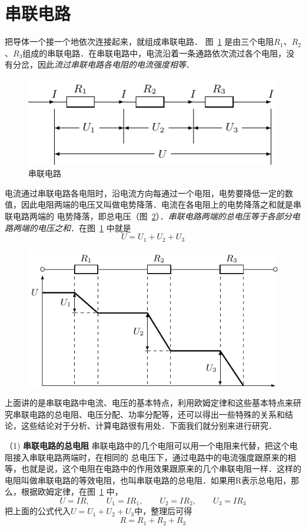 \section{串联电路}
把导体一个接一个地依次连接起来，就组成串联电路．
图~\ref{fig_B_7-5} 是由三个电阻$R_1$、$R_2$、$R_3$组成的串联电路．在串联电路中，电流沿着一条通路依次流过各个电阻，没有分岔，因此\textit{流过串联电路各电阻的电流强度相等}．
\begin{figure}[htbp]
    \centering
    \includegraphics{fig/B/7-5.pdf}
    \caption{串联电路}\label{fig_B_7-5}
\end{figure}	

电流通过串联电路各电阻时，沿电流方向每通过一个电阻，电势要降低一定的数值，因此电阻两端的电压又叫做电势降落．电流在各电阻上的电势降落之和就是串联电路两端的
电势降落，即总电压（图~\ref{fig_B_7-6}）．\textit{串联电路两端的总电压等于各部分电路两端的电压之和}．在图~\ref{fig_B_7-5} 中就是
\[U=U_1+U_2+U_3\]
\begin{figure}[htbp]
    \centering
    \includegraphics{fig/B/7-6.pdf}
    \caption{}\label{fig_B_7-6}
\end{figure}


上面讲的是串联电路中电流、电压的基本特点，利用欧姆定律和这些基本特点来研究串联电路的总电阻、电压分配、功率分配等，还可以得出一些特殊的关系和结论，这些结论对于分析、计算电路很有用处．下面我们就分别来进行研究．

（1) \textbf{串联电路的总电阻 } 串联电路中的几个电阻可以用一个电阻来代替，把这个电阻接入串联电路两端时，在相同的
总电压下，通过电路中的电流强度跟原来的相等，也就是说，这个电阻在电路中的作用效果跟原来的几个串联电阻一样．这样的电阻叫做串联电路的等效电阻，也叫串联电路的总电阻．如果用R表示总电阳，那么，根据欧姆定律，在图~\ref{fig_B_7-5} 中，
\[U=IR,\qquad  U_1=IR_1,\qquad U_2=IR_2,\qquad U_3=IR_3\]
把上面的公式代入$U=U_1+U_2+U_3$中，整理后可得
\[R=R_1+R_2+R_3\]

